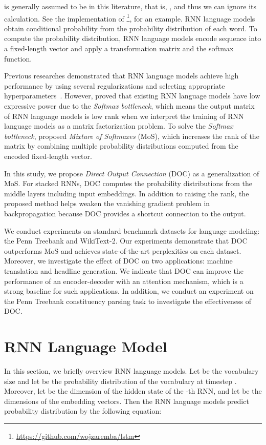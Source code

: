 \documentclass[11pt,a4paper]{article}
\begin{document}
 is generally assumed to be  in this literature, that is, , and thus we can ignore its calculation.
See the implementation of \footnote{\href{https://github.com/wojzaremba/lstm}{{https://github.com/wojzaremba/lstm}}}, for an example.
RNN language models obtain conditional probability  from the probability distribution of each word.
To compute the probability distribution, RNN language models encode sequence  into a fixed-length vector and apply a transformation matrix and the softmax function.


Previous researches demonstrated that RNN language models achieve high performance by using several regularizations and selecting appropriate hyperparameters~\cite{DBLP:journals/corr/MelisDB17,merityRegOpt}.
However,  proved that existing RNN language models have low expressive power due to the \textit{Softmax bottleneck}, which means the output matrix of RNN language models is low rank when we interpret the training of RNN language models as a matrix factorization problem.
To solve the \textit{Softmax bottleneck},  proposed \textit{Mixture of Softmaxes} (MoS), which increases the rank of the matrix by combining multiple probability distributions computed from the encoded fixed-length vector.


In this study, we propose \textit{Direct Output Connection} (DOC) as a generalization of MoS.
For stacked RNNs, DOC computes the probability distributions from the middle layers including input embeddings.
In addition to raising the rank, the proposed method helps weaken the vanishing gradient problem in backpropagation because DOC provides a shortcut connection to the output.


We conduct experiments on standard benchmark datasets for language modeling: the Penn Treebank and WikiText-2.
Our experiments demonstrate that DOC outperforms MoS and achieves state-of-the-art perplexities on each dataset.
Moreover, we investigate the effect of DOC on two applications: machine translation and headline generation.
We indicate that DOC can improve the performance of an encoder-decoder with an attention mechanism, which is a strong baseline for such applications.
In addition, we conduct an experiment on the Penn Treebank constituency parsing task to investigate the effectiveness of DOC.



\section{RNN Language Model}
In this section, we briefly overview RNN language models.
Let  be the vocabulary size and let  be the probability distribution of the vocabulary at timestep .
Moreover, let  be the dimension of the hidden state of the -th RNN, and let  be the dimensions of the embedding vectors.
Then the RNN language models predict probability distribution  by the following equation:
\end{document}
